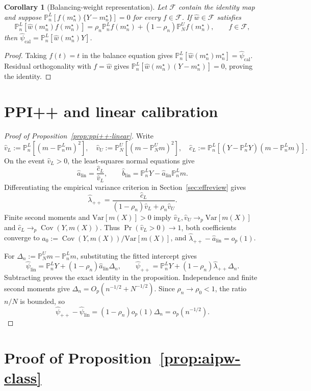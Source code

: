 \documentclass{article}
\theoremstyle{plain}
\newtheorem{corollary}{Corollary}
\theoremstyle{definition}
\newcommand{\Var}{\mathrm{Var}}
\newcommand{\1}{\mathbbm{1}}
\newcommand{\psihat}{\widehat{\psi}_{\mathrm{cal}}}
\newcommand{\rhozero}{\rho_0}
\newcommand{\rhon}{\rho_n}
\newcommand{\mtilde}{m_n^\star}
\newcommand{\Pl}{\mathbb{P}^{L}_n}
\newcommand{\Pu}{\mathbb{P}^{U}_N}
\newcommand{\Cov}{\operatorname{Cov}}
\begin{document}
\begin{corollary}[Balancing-weight representation]
\label{thm:repr2}
Let \(\mathcal F\) contain the identity map and suppose
\(\Pl[f(\mtilde)\{Y-\mtilde\}]=0\) for every \(f\in\mathcal F\).
If \(\hat w\in\mathcal F\) satisfies
\[
\Pl[\hat w(\mtilde)f(\mtilde)]
=\rhon\Pl f(\mtilde)+(1-\rhon)\Pu f(\mtilde),
\qquad f\in\mathcal F,
\]
then \(\psihat=\Pl[\hat w(\mtilde)Y]\).
\end{corollary}
\begin{proof}
Taking \(f(t)=t\) in the balance equation gives
\(\Pl[\hat w(\mtilde)\mtilde]=\psihat\).
Residual orthogonality with \(f=\hat w\) gives
\(\Pl[\hat w(\mtilde)(Y-\mtilde)]=0\), proving the identity.
\end{proof}

\section{PPI++ and linear calibration}
\label{sec:ppi++}

\begin{proof}[Proof of Proposition~\ref{prop:ppi++-linear}]
Write
\[
\hat v_L:=\Pl[(m-\Pl m)^2],\quad
\hat v_U:=\Pu[(m-\Pu m)^2],\quad
\hat c_L:=\Pl[(Y-\Pl Y)(m-\Pl m)].
\]
On the event \(\hat v_L>0\), the least-squares normal equations give
\[
\hat a_{\mathrm{lin}}=\frac{\hat c_L}{\hat v_L},
\qquad
\hat b_{\mathrm{lin}}=\Pl Y-\hat a_{\mathrm{lin}}\Pl m.
\]
Differentiating the empirical variance criterion in Section~\ref{sec:effreview} gives
\[
\hat\lambda_{++}
=\frac{\hat c_L}{(1-\rhon)\hat v_L+\rhon\hat v_U}.
\]
Finite second moments and \(\Var[m(X)]>0\) imply
\(\hat v_L,\hat v_U\to_p\Var[m(X)]\) and
\(\hat c_L\to_p\Cov(Y,m(X))\).
Thus \(\Pr(\hat v_L>0)\to1\), both coefficients converge to
\(a_0:=\Cov(Y,m(X))/\Var[m(X)]\), and
\(\hat\lambda_{++}-\hat a_{\mathrm{lin}}=o_p(1)\).

For \(\Delta_n:=\Pu m-\Pl m\), substituting the fitted intercept gives
\[
\widehat\psi_{\mathrm{lin}}=\Pl Y+(1-\rhon)\hat a_{\mathrm{lin}}\Delta_n,
\qquad
\widehat\psi_{++}=\Pl Y+(1-\rhon)\hat\lambda_{++}\Delta_n.
\]
Subtracting proves the exact identity in the proposition.
Independence and finite second moments give
\(\Delta_n=O_p(n^{-1/2}+N^{-1/2})\).
Since \(\rhon\to\rhozero<1\), the ratio \(n/N\) is bounded, so
\[
\widehat\psi_{++}-\widehat\psi_{\mathrm{lin}}
=(1-\rhon)o_p(1)\Delta_n=o_p(n^{-1/2}).
\]
\end{proof}

\section{Proof of Proposition~\ref{prop:aipw-class}}
\label{app:eif}
\end{document}
